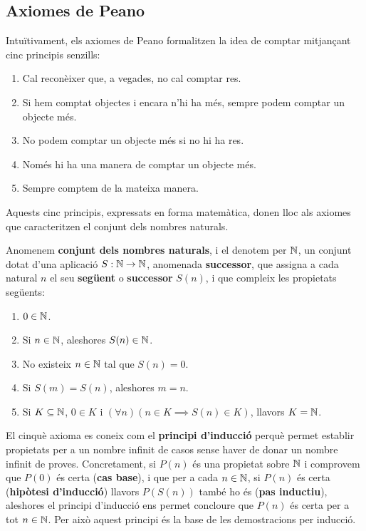 \subsection{Axiomes de Peano}

Intuïtivament, els axiomes de Peano formalitzen la idea de comptar mitjançant cinc principis senzills:

\begin{enumerate}
\item Cal reconèixer que, a vegades, no cal comptar res.
\item Si hem comptat objectes i encara n'hi ha més, sempre podem comptar un objecte més.
\item No podem comptar un objecte més si no hi ha res.
\item Només hi ha una manera de comptar un objecte més.
\item Sempre comptem de la mateixa manera.
\end{enumerate}

Aquests cinc principis, expressats en forma matemàtica, donen lloc als axiomes que caracteritzen el conjunt dels nombres naturals.

Anomenem \textbf{conjunt dels nombres naturals}, i el denotem per $\mathbb{N}$, un conjunt dotat d’una aplicació $S:\mathbb{N}\rightarrow \mathbb{N}$, anomenada \textbf{successor}, que assigna a cada natural $n$ el seu \textbf{següent} o \textbf{successor} $S(n)$, i que compleix les propietats següents:

\begin{enumerate}
\item $0\in \mathbb{N}$.
\item Si $n\in \mathbb{N}$, aleshores $S(n)\in \mathbb{N}$.
\item No existeix $n\in \mathbb{N}$ tal que $S(n)=0$.
\item Si $S(m)=S(n)$, aleshores $m=n$.
\item Si $K\subseteq \mathbb{N}$, $0\in K$ i $\left( \forall n\right) \left(n\in K\implies S(n)\in K\right)$, llavors $K=\mathbb{N}$.
\end{enumerate}

El cinquè axioma es coneix com el \textbf{principi d'inducció} perquè permet establir propietats per a un nombre infinit de casos sense haver de donar un nombre infinit de proves. Concretament, si $P(n)$ és una propietat sobre $\mathbb{N}$ i comprovem que $P(0)$ és certa (\textbf{cas base}), i que per a cada $n\in \mathbb{N}$, si $P(n)$ és certa (\textbf{hipòtesi d'inducció}) llavors $P(S(n))$ també ho és (\textbf{pas inductiu}), aleshores el principi d'inducció ens permet concloure que $P(n)$ és certa per a tot $n\in \mathbb{N}$. Per això aquest principi és la base de les demostracions per inducció.

